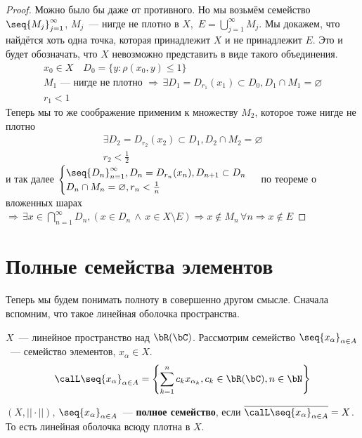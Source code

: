 \documentclass[document]{subfiles}
\begin{document}
\begin{proof}
    Можно было бы даже от противного. Но мы возьмём семейство $\seq{M_j}^\infty_{j=1}$, $M_j$~--- нигде не плотно в $X$, $\, E = \bigcup^\infty_{j=1} M_j$.
      Мы докажем, 
    что найдётся хоть одна точка, которая принадлежит $X$ и не принадлежит $E$. Это и будет обозначать, что $X$ невозможно представить
    в виде такого объединения.
    \begin{gather*}
        x_0 \in X \quad D_0 = \{ y: \rho(x_0, y) \leq 1\} \\
        M_1 \text{~--- нигде не плотно } \Rightarrow \, \exists D_1 = D_{r_1}(x_1) \subset D_0, D_1 \cap M_1 = \varnothing \\
        r_1 < 1
    \end{gather*}
    Теперь мы то же соображение применим к множеству $M_2$, которое тоже нигде не плотно
    \begin{gather*}
        \exists D_2 = D_{r_2}(x_2) \subset D_1, D_2 \cap M_2 = \varnothing \\
        r_2 < \frac{1}{2}
    \end{gather*}
    и так далее $\begin{cases}
         \seq{D_n}^\infty_{n=1}, D_n = D_{r_n} (x_n), D_{n+1} \subset D_n \\
         D_n \cap M_n = \varnothing, r_n < \frac{1}{n} \end{cases}$ по теореме о вложенных шарах
         $\Rightarrow \, \exists x \in \bigcap^\infty_{n=1}D_n, (x \in D_n \, \wedge \, x \in X \setminus E) \Rightarrow x \notin M_n \, \forall n \Rightarrow x \notin E$
\end{proof}


\section{Полные семейства элементов}

Теперь мы будем понимать полноту в совершенно другом смысле.
Сначала вспомним, что такое линейная оболочка пространства.
\begin{definition}
    $X$~--- линейное пространство над $\bR (\bC)$. Рассмотрим семейство $\seq{x_\alpha}_{\alpha \in A}$~--- семейство элементов, $x_\alpha \in X$.
    \[ \calL \seq{x_\alpha}_{\alpha \in A}  = \left\{ \sum^n_{k=1} c_k x_{\alpha_k}, c_k \in \bR (\bC), n \in \bN \right\} \]
\end{definition}


\begin{definition}
    $(X, || \cdot ||)$, $\seq{x_\alpha}_{\alpha \in A}$~--- \textbf{полное семейство}, если $\overline{\calL \seq{x_\alpha}_{\alpha \in A}} = X$.
    То есть линейная оболочка всюду плотна в $X$.
\end{definition}
\end{document}
